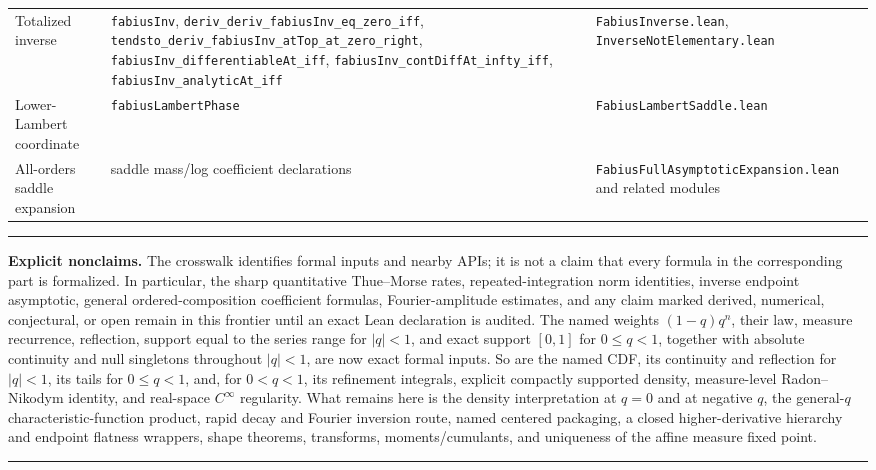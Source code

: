 \documentclass[11pt,oneside]{article}
\theoremstyle{definition}
\theoremstyle{remark}
\newenvironment{boxedremark}{%
  \par\smallskip\noindent\begin{center}\begin{minipage}{0.94\textwidth}%
  \color{black}\hrule\vspace{0.6em}\small
}{%
  \vspace{0.6em}\hrule\end{minipage}\end{center}\smallskip
}
\begin{document}
\begin{longtable}{@{}p{}p{}p{}@{}}
Totalized inverse & \nolinkurl{fabiusInv}, \nolinkurl{deriv_deriv_fabiusInv_eq_zero_iff}, \nolinkurl{tendsto_deriv_fabiusInv_atTop_at_zero_right}, \nolinkurl{fabiusInv_differentiableAt_iff}, \nolinkurl{fabiusInv_contDiffAt_infty_iff}, \nolinkurl{fabiusInv_analyticAt_iff} & \nolinkurl{FabiusInverse.lean}, \nolinkurl{InverseNotElementary.lean} \\
Lower-Lambert coordinate & \nolinkurl{fabiusLambertPhase} & \nolinkurl{FabiusLambertSaddle.lean} \\
All-orders saddle expansion & saddle mass/log coefficient declarations & \nolinkurl{FabiusFullAsymptoticExpansion.lean} and related modules \\
\bottomrule
\end{longtable}

\begin{boxedremark}
\textbf{Explicit nonclaims.}
The crosswalk identifies formal inputs and nearby APIs; it is not a claim that every formula
in the corresponding part is formalized.  In particular, the sharp quantitative
Thue--Morse rates, repeated-integration norm identities, inverse endpoint asymptotic,
general ordered-composition coefficient formulas, Fourier-amplitude estimates, and any
claim marked derived, numerical, conjectural, or open remain in this frontier until an exact
Lean declaration is audited.  The named weights \((1-q)q^n\), their law, measure recurrence,
reflection, support equal to the series range for \(|q|<1\), and exact support \([0,1]\) for
\(0\le q<1\), together with absolute continuity and null singletons throughout \(|q|<1\),
are now exact formal inputs.  So are the named CDF, its continuity and reflection for
\(|q|<1\), its tails for \(0\le q<1\), and, for \(0<q<1\), its refinement integrals,
explicit compactly supported density, measure-level Radon--Nikodym identity, and real-space
\(C^\infty\) regularity.  What remains here is the density interpretation at \(q=0\) and at
negative \(q\), the general-\(q\) characteristic-function product, rapid decay and Fourier
inversion route, named centered packaging, a closed higher-derivative hierarchy and endpoint
flatness wrappers, shape theorems, transforms, moments/cumulants, and uniqueness of the
affine measure fixed point.
\end{boxedremark}


\clearpage
\end{document}
